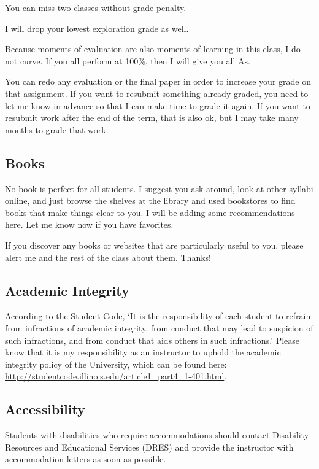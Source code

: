 \documentclass[11pt,letterpaper]{article}
\begin{document}
    You can miss two classes without grade penalty.

    I will drop your lowest exploration grade as well.

    Because moments of evaluation are also moments of learning in this
    class, I do not curve. If you all perform at 100\%, then I will give
    you all As.

    You can redo any  evaluation or the final paper in order  to  increase
    your grade on that  assignment. If you want to resubmit something already
    graded, you need  to let me know  in advance so that  I  can make  time to
    grade it again. If you want to resubmit work after the end of the term,
    that is also ok, but I may take many months to grade that work.

    \subsection*{Books}

    No book is perfect for all students. I suggest you ask around, look at
    other syllabi online, and just browse the shelves at the library and used
    bookstores to find books that make things clear to you.  I will be adding
    some recommendations here. Let me know now if you have favorites.

    If you discover any books or websites that are particularly useful to you,
    please alert me and the rest of the class about them. Thanks!

    \subsection*{Academic Integrity} According to the Student Code, `It is
    the responsibility of each student to refrain from infractions of
    academic integrity, from conduct that may lead to suspicion of such
    infractions, and from conduct that aids others in such infractions.’
    Please know that it is my responsibility as an instructor to uphold the
    academic integrity policy of the University, which can be found here:
    \url{http://studentcode.illinois.edu/article1_part4_1-401.html}.

\subsection*{Accessibility}
Students with disabilities who require accommodations should contact Disability Resources and Educational Services (DRES) and provide the instructor with accommodation letters as soon as possible.
\end{document}
